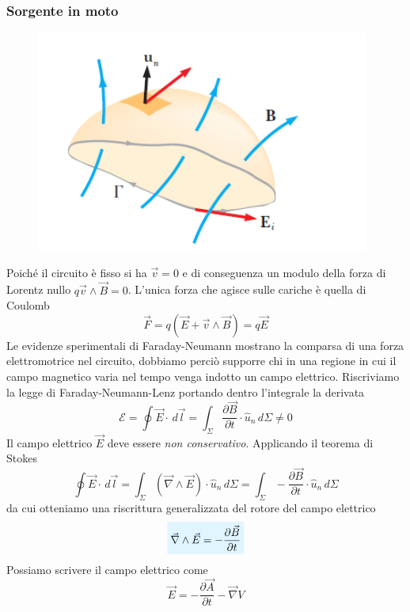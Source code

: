 \documentclass[x11names]{report}
\newcommand{\viola}[1]{%
	\colorbox{myblue}{$\displaystyle #1$}
}
\begin{document}
\subsubsection{Sorgente in moto}
\begin{figure}
	\vspace{-1cm}
	\includegraphics[scale=0.5]{img/farad_2.png}
\end{figure}
Poiché il circuito è fisso si ha \(\vec{v}=0\) e di conseguenza un modulo della forza di Lorentz nullo \(q\vec{v}\wedge\vec{B} = 0\). L'unica forza che agisce sulle cariche è quella di Coulomb
\[
\vec{F} = q\left(\vec{E} + \vec{v}\wedge\vec{B}\right) = q\vec{E}
\]
Le evidenze sperimentali di Faraday-Neumann mostrano la comparsa di una forza elettromotrice nel circuito, dobbiamo perciò supporre chi in una regione in cui il campo magnetico varia nel tempo venga indotto un campo elettrico. Riscriviamo la legge di Faraday-Neumann-Lenz portando dentro l'integrale la derivata
\[
\mathcal{E} = \oint \vec{E}\cdot \, d\vec{l} = \int_\Sigma \frac{\partial \vec{B}}{\partial t} \cdot \hat{u}_n  \, d\Sigma \neq 0
\]
Il campo elettrico \(\vec{E}\) deve essere \textit{non conservativo}. Applicando il teorema di Stokes
\[
\oint \vec{E}\cdot \, d\vec{l} = \int_\Sigma\left(\vec{\nabla}\wedge\vec{E}\right)\cdot \hat{u}_n \, d\Sigma = \int_\Sigma -\frac{\partial \vec{B}}{\partial t} \cdot \hat{u}_n  \, d\Sigma
\]
da cui otteniamo una riscrittura generalizzata del rotore del campo elettrico
\begin{equation}
	\viola{\vec{\nabla}\wedge\vec{E} = -\frac{\partial \vec{B}}{\partial t}}
\end{equation}
Possiamo scrivere il campo elettrico come
\begin{equation}
	\vec{E} = -\frac{\partial \vec{A}}{\partial t} - \vec{\nabla}V
\end{equation}
\end{document}
